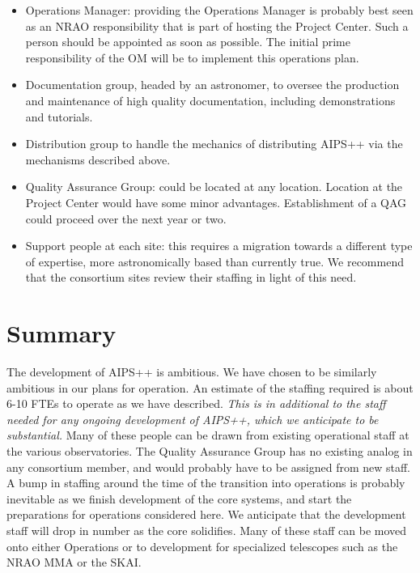 \begin{itemize}
\item Operations Manager: providing the Operations Manager is probably best 
seen as an NRAO responsibility that is part of hosting the Project Center.
Such a person should be appointed as soon as possible. The initial prime
responsibility of the OM will be to implement this operations plan.
\item Documentation group, headed by an astronomer, to oversee the
production and maintenance of high quality documentation, including
demonstrations and tutorials.
\item Distribution group to handle the mechanics of distributing AIPS++
via the mechanisms described above.
\item Quality Assurance Group: could be located at any location. Location 
at the Project Center would have some minor advantages. Establishment of
a QAG could proceed over the next year or two. 
\item Support people at each site: this requires a migration towards a
different type of expertise, more astronomically based than currently
true. We recommend that the consortium sites review their staffing
in light of this need.
\end{itemize}


\section{Summary}

The development of AIPS++ is ambitious. We have chosen to be similarly
ambitious in our plans for operation. An estimate of the staffing
required is about 6-10 FTEs to operate as we have described.
{\em This is in additional to the staff needed for any ongoing
development of AIPS++, which we anticipate to be substantial.}
Many of these people can be drawn from existing operational staff
at the various observatories. The Quality Assurance Group has no
existing analog in any consortium member, and would probably have to
be assigned from new staff. A bump in staffing around the time of
the transition into operations is probably inevitable as we finish
development of the core systems, and start the preparations for
operations considered here. We anticipate that the development staff
will drop in number as the core solidifies. Many of these staff can
be moved onto either Operations or to development for specialized
telescopes such as the NRAO MMA or the SKAI.
